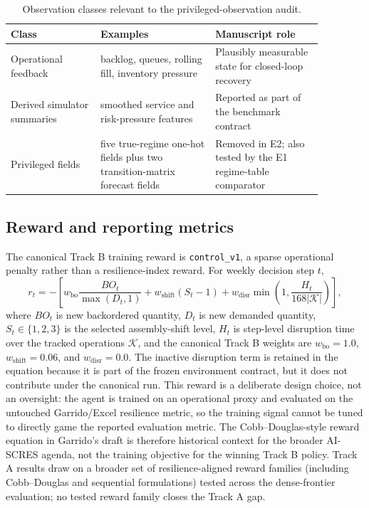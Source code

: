 \begin{table}[htbp]
\centering
\caption{Observation classes relevant to the privileged-observation audit.}
\label{tab:observation_classes}
\begin{tabular}{p{0.25\linewidth}p{0.32\linewidth}p{0.30\linewidth}}
\toprule
Class & Examples & Manuscript role \\
\midrule
Operational feedback & backlog, queues, rolling fill, inventory pressure & Plausibly measurable state for closed-loop recovery \\
Derived simulator summaries & smoothed service and risk-pressure features & Reported as part of the benchmark contract \\
Privileged fields & five true-regime one-hot fields plus two transition-matrix forecast fields & Removed in E2; also tested by the E1 regime-table comparator \\
\bottomrule
\end{tabular}
\end{table}

\hypertarget{33-reward-and-reporting-metrics}{%
\subsection{Reward and reporting
metrics}\label{33-reward-and-reporting-metrics}}

The canonical Track B training reward is \texttt{control\_v1}, a sparse
operational penalty rather than a resilience-index reward. For weekly
decision step $t$,
\begin{equation}
r_t =
-\left[
w_{\mathrm{bo}}\frac{BO_t}{\max(D_t,1)}
+ w_{\mathrm{shift}}(S_t-1)
+ w_{\mathrm{disr}}
\min\left(1,\frac{H_t}{168|\mathcal{K}|}\right)
\right],
\label{eq:control_v1}
\end{equation}
where $BO_t$ is new backordered quantity, $D_t$ is new demanded quantity,
$S_t\in\{1,2,3\}$ is the selected assembly-shift level, $H_t$ is
step-level disruption time over the tracked operations $\mathcal{K}$, and
the canonical Track B weights are $w_{\mathrm{bo}}=1.0$,
$w_{\mathrm{shift}}=0.06$, and $w_{\mathrm{disr}}=0.0$. The inactive
disruption term is retained in the equation because it is part of the
frozen environment contract, but it does not contribute under the
canonical run. This reward is a deliberate design choice, not an
oversight: the agent is trained on an operational proxy and evaluated on
the untouched Garrido/Excel resilience metric, so the training signal
cannot be tuned to directly game the reported evaluation metric. The
Cobb--Douglas-style reward equation in Garrido's draft is therefore
historical context for the broader AI-SCRES agenda, not the training
objective for the winning Track B policy. Track A results draw on a
broader set of resilience-aligned reward families (including
Cobb--Douglas and sequential formulations) tested across the
dense-frontier evaluation; no tested reward family closes the Track A
gap.


